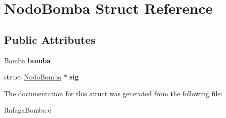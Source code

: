 \hypertarget{struct_nodo_bomba}{}\section{Nodo\+Bomba Struct Reference}
\label{struct_nodo_bomba}
\subsection*{Public Attributes}
\begin{DoxyCompactItemize}
\item 
\mbox{\label{struct_nodo_bomba_a0ebf03deca724f9f7eded563bc4f3c64}} 
\mbox{\hyperlink{_bomba_8h_aa7502670a5779cfa4126e95d52b1ce8b}{Bomba}} {\bfseries bomba}
\item 
\mbox{\label{struct_nodo_bomba_a3913d6bd9308a404edd28333515b1f1e}} 
struct \mbox{\hyperlink{struct_nodo_bomba}{Nodo\+Bomba}} $\ast$ {\bfseries sig}
\end{DoxyCompactItemize}


The documentation for this struct was generated from the following file\+:\begin{DoxyCompactItemize}
\item 
Rafaga\+Bomba.\+c\end{DoxyCompactItemize}
